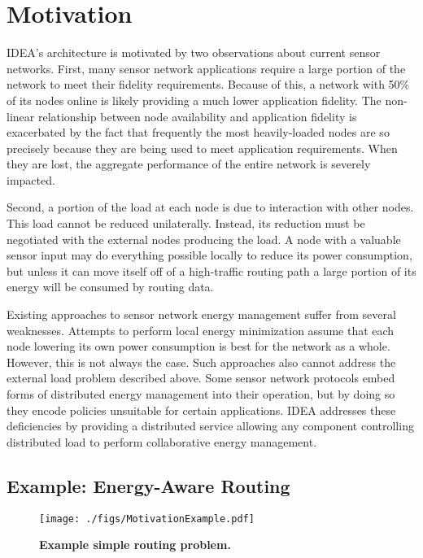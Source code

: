\section{Motivation}
\label{sec-motivation}

IDEA's architecture is motivated by two observations about current sensor
networks. First, many sensor network applications require a large portion of
the network to meet their fidelity requirements. Because of this, a network
with 50\% of its nodes online is likely providing a much lower application
fidelity. The non-linear relationship between node availability and
application fidelity is exacerbated by the fact that frequently the most
heavily-loaded nodes are so precisely because they are being used to meet
application requirements. When they are lost, the aggregate performance of
the entire network is severely impacted.

Second, a portion of the load at each node is due to interaction with other
nodes. This load cannot be reduced unilaterally. Instead, its reduction must
be negotiated with the external nodes producing the load. A node with a
valuable sensor input may do everything possible locally to reduce its power
consumption, but unless it can move itself off of a high-traffic routing path
a large portion of its energy will be consumed by routing data.  

Existing approaches to sensor network energy management suffer from several
weaknesses. Attempts to perform local energy minimization assume that each
node lowering its own power consumption is best for the network as a whole.
However, this is not always the case. Such approaches also cannot address
the external load problem described above. Some sensor network
protocols embed forms of distributed energy management into their operation,
but by doing so they encode policies unsuitable for certain
applications. IDEA addresses these deficiencies by providing a distributed
service allowing any component controlling distributed load to perform
collaborative energy management.

\subsection{Example: Energy-Aware Routing}

\begin{figure}[t]
\begin{center}
\texttt{[image: ./figs/MotivationExample.pdf]}
\end{center}
\caption{\small{\textbf{Example simple routing problem.}}}
\label{fig-motivationexample}
\end{figure}

